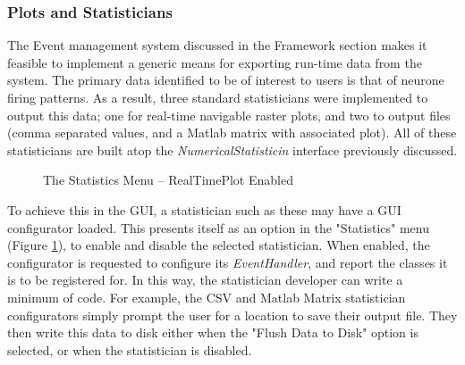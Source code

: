\documentclass{acm_proc_article-sp}
\begin{document}
\subsubsection{Plots and Statisticians}
{
The Event management system discussed in the Framework section makes it feasible to implement a generic means for exporting run{}-time data from the system. The primary data identified to be of interest to users is that of neurone firing patterns. As a result, three standard statisticians were implemented to output this data; one for real-time navigable raster plots, and two to output files (comma separated values, and a Matlab matrix with associated plot). All of these statisticians are built atop the {\textit{NumericalStatisticin}} interface previously discussed.

\begin{figure}[t]
\centering
{}
\caption{The Statistics Menu {--} RealTimePlot Enabled}
\label{fig:ui:statsmenu}
\end{figure}

To achieve this in the GUI, a statistician such as these may have a GUI configurator loaded. This presents itself as an option in the "Statistics" menu (Figure \ref{fig:ui:statsmenu}), to enable and disable the selected statistician. When enabled, the configurator is requested to configure its {\textit{EventHandler}}, and report the classes it is to be registered for. In this way, the statistician developer can write a minimum of code. For example, the CSV and Matlab Matrix statistician configurators simply prompt the user for a location to save their output file. They then write this data to disk either when the "Flush Data to Disk" option is selected, or when the statistician is disabled.

}
\end{document}
